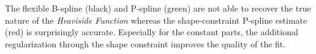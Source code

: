 The flexible B-spline (black) and P-spline (green) are not able to recover the true nature of the \emph{Heaviside Function} whereas the shape-constraint P-spline estimate (red) is surprisingly accurate. Especially for the constant parts, the additional regularization through the shape constraint improves the quality of the fit. 